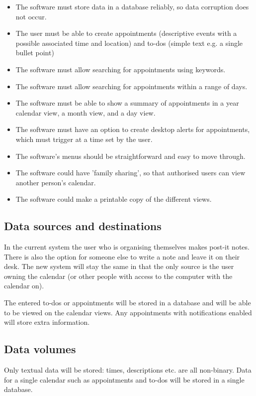 \begin{itemize}
  \item The software must store data in a database reliably, so data corruption
      does not occur.
  \item The user must be able to create appointments (descriptive events with a
      possible associated time and location) and to-dos (simple text e.g. a
      single bullet point)
  \item The software must allow searching for appointments using keywords.
  \item The software must allow searching for appointments within a range of
      days.
  \item The software must be able to show a summary of appointments in a year
      calendar view, a month view, and a day view.
  \item The software must have an option to create desktop alerts for
      appointments, which must trigger at a time set by the user.
  \item The software's menus should be straightforward and easy to move through.
  \item The software could have 'family sharing', so that authorised users can
      view another person's calendar.
  \item The software could make a printable copy of the different views.
  \end{itemize}


\subsection{Data sources and destinations}

In the current system the user who is organising themselves makes post-it notes.
There is also the option for someone else to write a note and leave it on their
desk. The new system will stay the same in that the only source is the user
owning the calendar (or other people with access to the computer with the
calendar on).

The entered to-dos or appointments will be stored in a database and will be able
to be viewed on the calendar views. Any appointments with notifications enabled will
store extra information.


\subsection{Data volumes}

Only textual data will be stored: times, descriptions etc. are all
non-binary. Data for a single calendar such as appointments and to-dos will be
stored in a single database.

